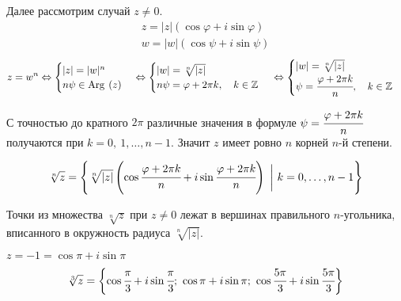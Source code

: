 Далее рассмотрим случай $z \neq 0$. 
\begin{gather*}
z = |z|\left(\cos\varphi+i\sin\varphi\right)\\
w = |w|\left(\cos\psi+i\sin\psi\right)
\end{gather*}
\[
z = w^n \Leftrightarrow
\begin{cases}
|z| = |w|^n \\
n\psi\in\mathrm{Arg\:}\left(z\right)
\end{cases}
\Leftrightarrow
\begin{cases}
|w|= \sqrt[n]{|z|}\\
n\psi= \varphi+2\pi k,\quad k\in \mathbb Z
\end{cases}\\
\Leftrightarrow
\begin{cases}
|w|=\sqrt[n]{|z|}\\
\psi = \cfrac{\varphi+2\pi k}{n},\quad k \in \mathbb{Z}
\end{cases}
\]

С точностью до кратного $2\pi$ различные значения в формуле $\psi = \cfrac{\varphi+2\pi k }{n}$ получаются при $k = 0,\ 1,\ldots,n-1$. Значит $z$ имеет ровно $n$ корней $n$-й степени. 

\[ \sqrt[n]{z} = \Biggl\{\sqrt[n]{|z|}\left(\cos\cfrac{\varphi+2\pi k}{n}+i\sin\cfrac{\varphi+2\pi k }{n}\right)\ \biggl|\ k=0,\ldots,n-1\Biggr\}
\]

\begin{Comment}
Точки из множества $\sqrt[n]{z}$ при $z\neq 0$ лежат в вершинах правильного $n$-угольника, вписанного в окружность радиуса $\sqrt[n]{|z|}$. 
\end{Comment}

\begin{Examples} $z=-1=\cos\pi+i\sin\pi $
$$\sqrt[3]{z} = \biggl\{ \cos\cfrac\pi3+i\sin\cfrac\pi3;\ \cos\pi+i\sin\pi;\ \cos\cfrac{5\pi}{3}+i\sin\cfrac{5\pi}{3} \biggl\}
$$
\begin{center}
\end{center}

\end{Examples}

